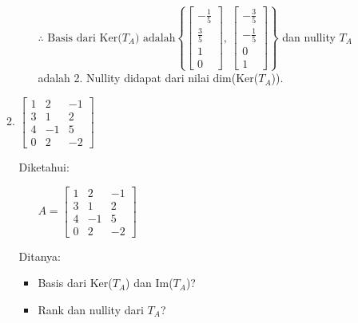 \documentclass[12pt, a4paper]{scrartcl}
\begin{document}
\begin{enumerate}
\begin{enumerate}
            \begin{itemize}
                \item[$\therefore$] $\mbox{Basis dari Ker(}T_A \mbox{) adalah} \left\{ \begin{bmatrix}
                    -\frac{1}{5}\\\frac{3}{5}\\1\\0
                \end{bmatrix}\mbox{, } \begin{bmatrix}
                    -\frac{3}{5}\\-\frac{1}{5}\\0\\1
                \end{bmatrix} \right\}$ dan nullity $T_A$ adalah 2. Nullity didapat dari nilai dim(Ker($T_A$)). 
            \end{itemize}

            \pagebreak

            \setcounter{enumii}{2}
            \item $\begin{bmatrix}
                1 & 2 & -1\\
                3 & 1 & 2\\
                4 & -1 & 5\\
                0 & 2 & -2
            \end{bmatrix}$

            Diketahui:
            \begin{itemize}
                \item[] $A=\begin{bmatrix}
                    1 & 2 & -1\\
                    3 & 1 & 2\\
                    4 & -1 & 5\\
                    0 & 2 & -2
                \end{bmatrix}$
            \end{itemize}

            Ditanya:
            \begin{itemize}
                \item Basis dari Ker($T_A$) dan Im($T_A$)?
                \item Rank dan nullity dari $T_A$?
            \end{itemize}
            

\end{enumerate}
\end{enumerate}
\end{document}
